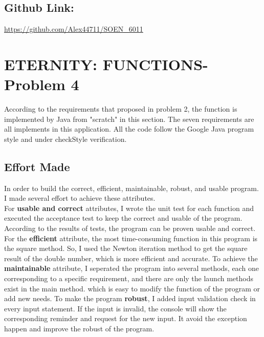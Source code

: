 \documentclass[11pt]{report}
\begin{document}
\subsection*{Github Link:}
\url{https://github.com/Alex44711/SOEN_6011}
\section*{ETERNITY: FUNCTIONS-Problem 4}
According to the requirements that proposed in problem 2, the function is implemented by Java from "scratch" in this section. The seven requirements are all implements in this application. All the code follow the Google Java program style and under checkStyle verification.
\subsection*{Effort Made}
In  order to build the correct, efficient, maintainable, robust, and usable program. I made several effort to achieve these attributes.\\
For \textbf{usable and correct} attributes, I wrote the unit test for each function and executed the acceptance test  to keep the correct and usable of the program. According to the results of tests, the program can be proven usable and correct. For the \textbf{efficient} attribute, the most time-consuming function in this program is the square method. So, I used the Newton iteration method to get the square result of the double number, which is more efficient and accurate. To achieve the \textbf{maintainable} attribute, I seperated the program into several methods, each one corresponding to a specific requirement, and there are only the launch methods exist in the main method. which is easy to modify the function of the program or add new needs. To make the program \textbf{robust}, I added input validation check in every input statement. If the input is invalid, the console will show the corresponding reminder and request for the new input. It avoid the exception happen and improve the robust of the program.
\end{document}
